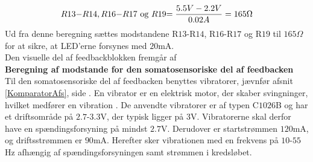 
\begin{equation}
R$13$-R$14$, R$16$-R$17$\text{ og }R$19$ = \dfrac{5.5V - 2.2V}{0.02A} = 165\Omega
\end{equation}
\noindent Ud fra denne beregning sættes modstandene R$13$-R$14$, R$16$-R$17$ og R$19$ til $165\Omega$ for at sikre, at LED'erne forsynes med $20$mA. \\
Den visuelle del af feedbackblokken fremgår af  \\



\noindent\textbf{Beregning af modstande for den somatosensoriske del af feedbacken} \\
Til den somatosensoriske del af feedbacken benyttes vibratorer, jævnfør afsnit \ref{KomparatorAfs}, side \pageref{KomparatorAfs}. En vibrator er en elektrisk motor, der skaber svingninger, hvilket medfører en vibration \cite{Redaktionen2009}. De anvendte vibratorer er af typen C$1026$B og har et driftsområde på $2.7$-$3.3$V, der typisk ligger på $3$V. Vibratorerne skal derfor have en spændingsforsyning på mindst $2.7$V. Derudover er startstrømmen $120$mA, og driftsstrømmen er $90$mA. Herefter sker vibrationen med en frekvens på $10$-$55$Hz afhængig af spændingsforsyningen samt strømmen i kredsløbet. \cite{Machinery2009} %

